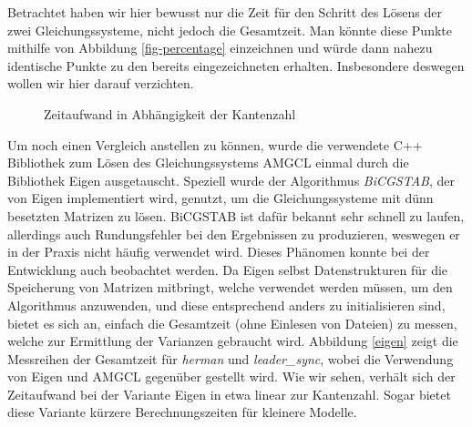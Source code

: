 \documentclass[a4paper]{article}
\theoremstyle{nonumberplain}
\begin{document}
	Betrachtet haben wir hier bewusst nur die Zeit für den Schritt des Lösens der zwei Gleichungssysteme, nicht jedoch die Gesamtzeit. Man könnte diese Punkte mithilfe von Abbildung \ref{fig-percentage} einzeichnen und würde dann nahezu identische Punkte zu den bereits eingezeichneten erhalten. Insbesondere deswegen wollen wir hier darauf verzichten.
	
	
	\begin{figure}
		\caption{Zeitaufwand in Abhängigkeit der Kantenzahl}
		\label{fig-in-edges1}
		\centering
	\end{figure}
	
	Um noch einen Vergleich anstellen zu können, wurde die verwendete C++ Bibliothek zum Lösen des Gleichungssystems AMGCL einmal durch die Bibliothek Eigen ausgetauscht. Speziell wurde der Algorithmus \textit{BiCGSTAB}, der von Eigen implementiert wird, genutzt, um die Gleichungssysteme mit dünn besetzten Matrizen zu lösen. BiCGSTAB ist dafür bekannt sehr schnell zu laufen, allerdings auch Rundungsfehler bei den Ergebnissen zu produzieren, weswegen er in der Praxis nicht häufig verwendet wird. Dieses Phänomen konnte bei der Entwicklung auch beobachtet werden. Da Eigen selbst Datenstrukturen für die Speicherung von Matrizen mitbringt, welche verwendet werden müssen, um den Algorithmus anzuwenden, und diese entsprechend anders zu initialisieren sind, bietet es sich an, einfach die Gesamtzeit (ohne Einlesen von Dateien) zu messen, welche zur Ermittlung der Varianzen gebraucht wird. Abbildung \ref{eigen} zeigt die Messreihen der Gesamtzeit für \textit{herman} und \textit{leader\_sync}, wobei die Verwendung von Eigen und AMGCL gegenüber gestellt wird. Wie wir sehen, verhält sich der Zeitaufwand bei der Variante Eigen in etwa linear zur Kantenzahl. Sogar bietet diese Variante kürzere Berechnungszeiten für kleinere Modelle.
	
\end{document}
